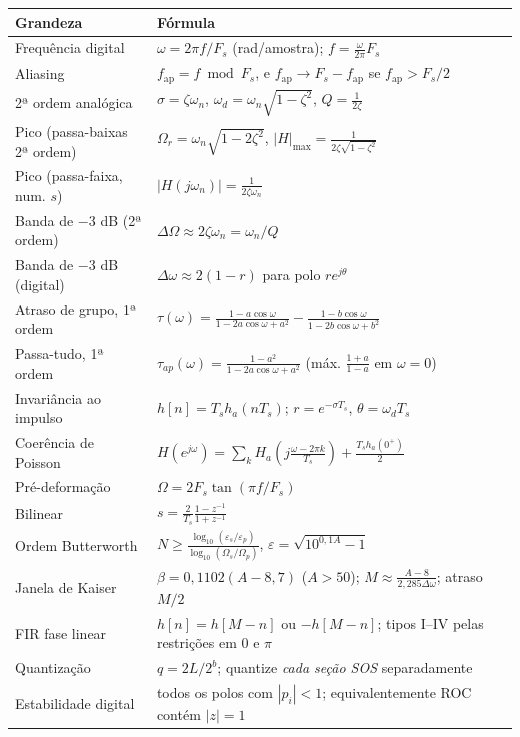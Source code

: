 \begin{center}
\begin{tabular}{p{6.0cm}p{9.0cm}}
\toprule
Grandeza & Fórmula\\
\midrule
Frequência digital & $\omega=2\pi f/F_s$ (rad/amostra); $f=\frac{\omega}{2\pi}F_s$\\
Aliasing & $f_{\text{ap}}=f\bmod F_s$, e $f_{\text{ap}}\to F_s-f_{\text{ap}}$ se $f_{\text{ap}}>F_s/2$\\
2ª ordem analógica & $\sigma=\zeta\omega_n$, $\omega_d=\omega_n\sqrt{1-\zeta^2}$, $Q=\frac{1}{2\zeta}$\\
Pico (passa-baixas 2ª ordem) & $\Omega_r=\omega_n\sqrt{1-2\zeta^2}$, $|H|_{\max}=\frac{1}{2\zeta\sqrt{1-\zeta^2}}$\\
Pico (passa-faixa, num. $s$) & $|H(j\omega_n)|=\frac{1}{2\zeta\omega_n}$\\
Banda de $-3$ dB (2ª ordem) & $\Delta\Omega\approx2\zeta\omega_n=\omega_n/Q$\\
Banda de $-3$ dB (digital) & $\Delta\omega\approx2(1-r)$ para polo $re^{j\theta}$\\
Atraso de grupo, 1ª ordem & $\tau(\omega)=\frac{1-a\cos\omega}{1-2a\cos\omega+a^2}-\frac{1-b\cos\omega}{1-2b\cos\omega+b^2}$\\
Passa-tudo, 1ª ordem & $\tau_{ap}(\omega)=\frac{1-a^2}{1-2a\cos\omega+a^2}$ (máx. $\frac{1+a}{1-a}$ em $\omega=0$)\\
Invariância ao impulso & $h[n]=T_sh_a(nT_s)$; $r=e^{-\sigma T_s}$, $\theta=\omega_dT_s$\\
Coerência de Poisson & $H(e^{j\omega})=\sum_kH_a\!\left(j\frac{\omega-2\pi k}{T_s}\right)+\frac{T_sh_a(0^+)}{2}$\\
Pré-deformação & $\Omega=2F_s\tan(\pi f/F_s)$\\
Bilinear & $s=\frac{2}{T_s}\frac{1-z^{-1}}{1+z^{-1}}$\\
Ordem Butterworth & $N\ge\frac{\log_{10}(\varepsilon_s/\varepsilon_p)}{\log_{10}(\Omega_s/\Omega_p)}$, $\varepsilon=\sqrt{10^{0{,}1A}-1}$\\
Janela de Kaiser & $\beta=0{,}1102(A-8{,}7)$ ($A>50$); $M\approx\frac{A-8}{2{,}285\Delta\omega}$; atraso $M/2$\\
FIR fase linear & $h[n]=h[M-n]$ ou $-h[M-n]$; tipos I--IV pelas restrições em $0$ e $\pi$\\
Quantização & $q=2L/2^{b}$; quantize \emph{cada seção SOS} separadamente\\
Estabilidade digital & todos os polos com $|p_i|<1$; equivalentemente ROC contém $|z|=1$\\
\bottomrule
\end{tabular}
\end{center}
